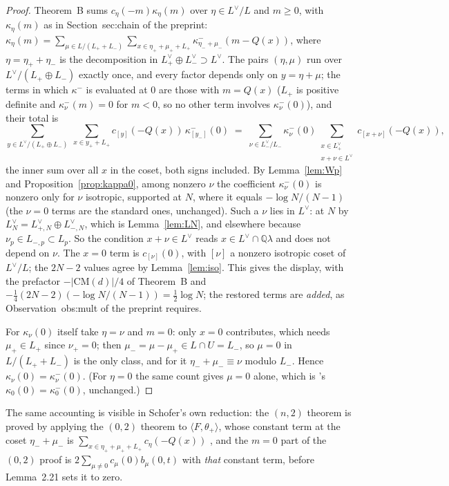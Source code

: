\documentclass[11pt,reqno]{amsart}
\theoremstyle{plain}
\theoremstyle{definition}
\newcommand{\Q}{\mathbb{Q}}
\newcommand{\Ldual}{L^{\vee}}
\newcommand{\Lm}{L_{-}}
\newcommand{\Lp}{L_{+}}
\begin{document}
\begin{proof}
Theorem~B sums $c_\eta(-m)\kappa_\eta(m)$ over $\eta\in\Ldual/L$ and $m\ge0$, with $\kappa_\eta(m)$
as in \textup{Section~sec:chain of the preprint}: $\kappa_\eta(m)=\sum_{\mu\in L/(\Lp+\Lm)}\sum_{x\in\eta_++\mu_++\Lp}
\kappa^-_{\eta_-+\mu_-}(m-Q(x))$, where $\eta=\eta_++\eta_-$ is the decomposition in
$\Lp^\vee\oplus\Lm^\vee\supset\Ldual$. The pairs $(\eta,\mu)$ run over $\Ldual/(\Lp\oplus\Lm)$
exactly once, and every factor depends only on $y=\eta+\mu$; the terms in which $\kappa^-$ is
evaluated at $0$ are those with $m=Q(x)$ ($\Lp$ is positive definite and $\kappa^-_\nu(m)=0$ for
$m<0$, so no other term involves $\kappa^-_\nu(0)$), and their total is
\[
  \sum_{y\in\Ldual/(\Lp\oplus\Lm)}\ \sum_{x\in y_++\Lp}c_{[y]}(-Q(x))\,\kappa^-_{[y_-]}(0)
  \;=\;\sum_{\nu\in\Lm^\vee/\Lm}\kappa^-_\nu(0)\sum_{\substack{x\in\Lp^\vee\\ x+\nu\in\Ldual}}
      c_{[x+\nu]}(-Q(x)),
\]
the inner sum over all $x$ in the coset, both signs included. By Lemma~\ref{lem:Wp} and
Proposition~\ref{prop:kappa0}, among nonzero $\nu$ the coefficient $\kappa^-_\nu(0)$ is nonzero
only for $\nu$ isotropic, supported at $N$, where it equals $-\log N/(N-1)$ (the $\nu=0$ terms are
the standard ones, unchanged). Such a $\nu$ lies in $\Ldual$: at $N$ by $L_N^\vee=L_{+,N}^\vee
\oplus L_{-,N}^\vee$, which is Lemma~\ref{lem:LN}, and elsewhere because $\nu_p\in L_{-,p}\subset
L_p$. So the condition $x+\nu\in\Ldual$ reads $x\in\Ldual\cap\Q\lambda$ and does not depend on
$\nu$. The $x=0$ term is $c_{[\nu]}(0)$, with $[\nu]$ a nonzero isotropic coset of $\Ldual/L$; the
$2N-2$ values agree by Lemma~\ref{lem:iso}. This gives the display, with the prefactor
$-\lvert\mathrm{CM}(d)\rvert/4$ of Theorem~B and $-\tfrac14(2N-2)(-\log N/(N-1))=\tfrac12\log N$;
the restored terms are \emph{added}, as \textup{Observation~obs:mult of the preprint} requires.

For $\kappa_\nu(0)$ itself take $\eta=\nu$ and $m=0$: only $x=0$ contributes, which needs
$\mu_+\in\Lp$ since $\nu_+=0$; then $\mu_-=\mu-\mu_+\in L\cap U=\Lm$, so $\mu=0$ in $L/(\Lp+\Lm)$
is the only class, and for it $\eta_-+\mu_-\equiv\nu$ modulo $\Lm$. Hence $\kappa_\nu(0)=
\kappa^-_\nu(0)$. (For $\eta=0$ the same count gives $\mu=0$ alone, which is \cite[Lemma~20]{Yang}'s
$\kappa_0(0)=\kappa^-_0(0)$, unchanged.)
\end{proof}

The same accounting is visible in Schofer's own reduction: the $(n,2)$ theorem is proved by
applying the $(0,2)$ theorem to $\langle F,\theta_+\rangle$, whose constant term at the coset
$\eta_-+\mu_-$ is $\sum_{x\in\eta_++\mu_++\Lp}c_\eta(-Q(x))$ \cite[Cor.~3.2]{Schofer}, and the
$m=0$ part of the $(0,2)$ proof is $2\sum_{\mu\neq0}c_\mu(0)b_\mu(0,t)$ with \emph{that}
constant term, before Lemma~2.21 sets it to zero.
\end{document}

